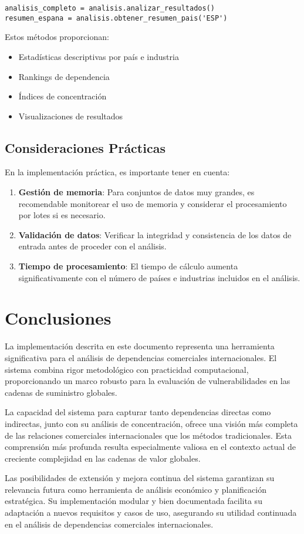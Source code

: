\documentclass[authoryear]{elsarticle}
\begin{document}
\begin{verbatim}
analisis_completo = analisis.analizar_resultados()
resumen_espana = analisis.obtener_resumen_pais('ESP')
\end{verbatim}

Estos métodos proporcionan:
\begin{itemize}
    \item Estadísticas descriptivas por país e industria
    \item Rankings de dependencia
    \item Índices de concentración
    \item Visualizaciones de resultados
\end{itemize}

\subsection{Consideraciones Prácticas}

En la implementación práctica, es importante tener en cuenta:

\begin{enumerate}
    \item \textbf{Gestión de memoria}: Para conjuntos de datos muy grandes, es recomendable monitorear el uso de memoria y considerar el procesamiento por lotes si es necesario.
    
    \item \textbf{Validación de datos}: Verificar la integridad y consistencia de los datos de entrada antes de proceder con el análisis.
    
    \item \textbf{Tiempo de procesamiento}: El tiempo de cálculo aumenta significativamente con el número de países e industrias incluidos en el análisis.
\end{enumerate}


\section{Conclusiones}

La implementación descrita en este documento representa una herramienta significativa para el análisis de dependencias comerciales internacionales. El sistema combina rigor metodológico con practicidad computacional, proporcionando un marco robusto para la evaluación de vulnerabilidades en las cadenas de suministro globales.

La capacidad del sistema para capturar tanto dependencias directas como indirectas, junto con su análisis de concentración, ofrece una visión más completa de las relaciones comerciales internacionales que los métodos tradicionales. Esta comprensión más profunda resulta especialmente valiosa en el contexto actual de creciente complejidad en las cadenas de valor globales.

Las posibilidades de extensión y mejora continua del sistema garantizan su relevancia futura como herramienta de análisis económico y planificación estratégica. Su implementación modular y bien documentada facilita su adaptación a nuevos requisitos y casos de uso, asegurando su utilidad continuada en el análisis de dependencias comerciales internacionales.
\end{document}
